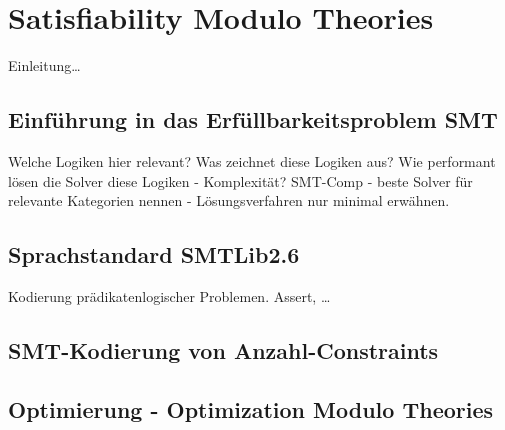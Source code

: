 \chapter{Satisfiability Modulo Theories}
Einleitung\ldots

\section{Einführung in das Erfüllbarkeitsproblem SMT}
Welche Logiken hier relevant?
Was zeichnet diese Logiken aus?
Wie performant lösen die Solver diese Logiken - Komplexität?
SMT-Comp - beste Solver für relevante Kategorien nennen - Lösungsverfahren nur minimal erwähnen.

\section{Sprachstandard SMTLib2.6}
Kodierung prädikatenlogischer Problemen.
Assert, \ldots

\section{SMT-Kodierung von Anzahl-Constraints}

\section{Optimierung - Optimization Modulo Theories}
